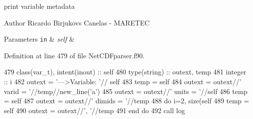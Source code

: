 print variable metadata 

\begin{DoxyAuthor}{Author}
Ricardo Birjukovs Canelas -\/ M\+A\+R\+E\+T\+EC 
\end{DoxyAuthor}

\begin{DoxyParams}[1]{Parameters}
\mbox{\tt in}  & {\em self} & \\
\hline
\end{DoxyParams}


Definition at line 479 of file Net\+C\+D\+Fparser.\+f90.


\begin{DoxyCode}
479     \textcolor{keywordtype}{class}(var\_t), \textcolor{keywordtype}{intent(inout)} :: self
480     \textcolor{keywordtype}{type}(string) :: outext, temp
481     \textcolor{keywordtype}{integer} :: i
482     outext = \textcolor{stringliteral}{'--->Variable: '}// self%
483     temp = self%
484     outext = outext//\textcolor{stringliteral}{'       varid = '}//temp//new\_line(\textcolor{stringliteral}{'a'})
485     outext = outext//\textcolor{stringliteral}{'       units = '}//self%
486     temp = self%
487     outext = outext//\textcolor{stringliteral}{'       dimids = '}//temp
488     \textcolor{keywordflow}{do} i=2, \textcolor{keyword}{size}(self%
489         temp = self%
490         outext = outext//\textcolor{stringliteral}{', '}//temp
491 \textcolor{keywordflow}{    end do}
492     \textcolor{keyword}{call }log%
\end{DoxyCode}
